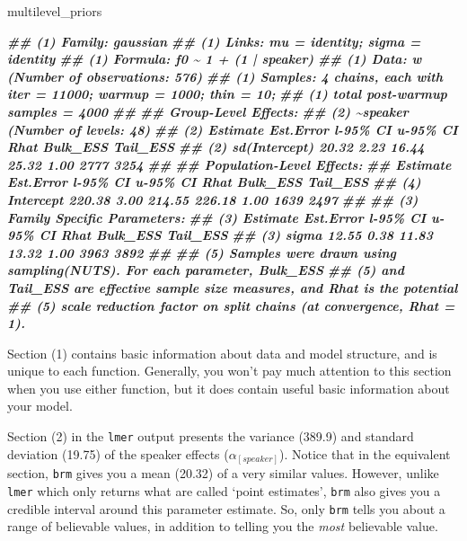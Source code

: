 \documentclass[
]{book}
\newenvironment{Shaded}{\begin{snugshade}}{\end{snugshade}}
\newcommand{\DocumentationTok}[1]{\textcolor[rgb]{0.56,0.35,0.01}{\textbf{\textit{#1}}}}
\newcommand{\NormalTok}[1]{#1}
\begin{document}
\begin{Shaded}
\begin{Highlighting}[]
\NormalTok{multilevel\_priors}

\DocumentationTok{\#\# (1)  Family: gaussian }
\DocumentationTok{\#\# (1)   Links: mu = identity; sigma = identity }
\DocumentationTok{\#\# (1) Formula: f0 \textasciitilde{} 1 + (1 | speaker) }
\DocumentationTok{\#\# (1)    Data: w (Number of observations: 576) }
\DocumentationTok{\#\# (1) Samples: 4 chains, each with iter = 11000; warmup = 1000; thin = 10;}
\DocumentationTok{\#\# (1)          total post{-}warmup samples = 4000}
\DocumentationTok{\#\#  }
\DocumentationTok{\#\#     Group{-}Level Effects: }
\DocumentationTok{\#\# (2) \textasciitilde{}speaker (Number of levels: 48) }
\DocumentationTok{\#\# (2)               Estimate Est.Error l{-}95\% CI u{-}95\% CI Rhat Bulk\_ESS Tail\_ESS}
\DocumentationTok{\#\# (2) sd(Intercept)    20.32      2.23    16.44    25.32 1.00     2777     3254}
\DocumentationTok{\#\#  }
\DocumentationTok{\#\#     Population{-}Level Effects: }
\DocumentationTok{\#\#               Estimate Est.Error l{-}95\% CI u{-}95\% CI Rhat Bulk\_ESS Tail\_ESS}
\DocumentationTok{\#\# (4) Intercept   220.38      3.00   214.55   226.18 1.00     1639     2497}
\DocumentationTok{\#\#  }
\DocumentationTok{\#\# (3) Family Specific Parameters: }
\DocumentationTok{\#\# (3)        Estimate Est.Error l{-}95\% CI u{-}95\% CI Rhat Bulk\_ESS Tail\_ESS}
\DocumentationTok{\#\# (3) sigma    12.55      0.38    11.83    13.32 1.00     3963     3892}
\DocumentationTok{\#\# }
\DocumentationTok{\#\# (5) Samples were drawn using sampling(NUTS). For each parameter, Bulk\_ESS}
\DocumentationTok{\#\# (5) and Tail\_ESS are effective sample size measures, and Rhat is the potential}
\DocumentationTok{\#\# (5) scale reduction factor on split chains (at convergence, Rhat = 1).}
\end{Highlighting}
\end{Shaded}

Section (1) contains basic information about data and model structure, and is unique to each function. Generally, you won't pay much attention to this section when you use either function, but it does contain useful basic information about your model.

Section (2) in the \texttt{lmer} output presents the variance (389.9) and standard deviation (19.75) of the speaker effects (\(\alpha_{[speaker]}\)). Notice that in the equivalent section, \texttt{brm} gives you a mean (20.32) of a very similar values. However, unlike \texttt{lmer} which only returns what are called `point estimates', \texttt{brm} also gives you a credible interval around this parameter estimate. So, only \texttt{brm} tells you about a range of believable values, in addition to telling you the \emph{most} believable value.
\end{document}
